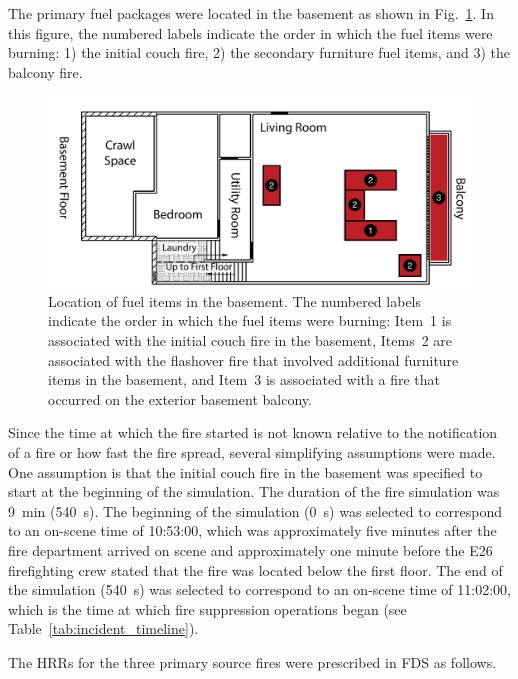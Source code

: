 \documentclass[12pt,oneside]{book}
\begin{document}
The primary fuel packages were located in the basement as shown in Fig.~\ref{fig:fuel_placement}. In this figure, the numbered labels indicate the order in which the fuel items were burning: 1) the initial couch fire, 2) the secondary furniture fuel items, and 3) the balcony fire.

\begin{figure}[!ht]
\includegraphics[width=5.5in]{../Figures/Plan_Basement_Fuels}
\caption[Location of fuel items in the basement.]
{Location of fuel items in the basement. The numbered labels indicate the order in which the fuel items were burning: Item~1 is associated with the initial couch fire in the basement, Items~2 are associated with the flashover fire that involved additional furniture items in the basement, and Item~3 is associated with a fire that occurred on the exterior basement balcony.}
\label{fig:fuel_placement}
\end{figure}


\clearpage


Since the time at which the fire started is not known relative to the notification of a fire or how fast the fire spread, several simplifying assumptions were made. One assumption is that the initial couch fire in the basement was specified to start at the beginning of the simulation. The duration of the fire simulation was 9~min (540~s). The beginning of the simulation (0~s) was selected to correspond to an on-scene time of 10:53:00, which was approximately five minutes after the fire department arrived on scene and approximately one minute before the E26 firefighting crew stated that the fire was located below the first floor. The end of the simulation (540~s) was selected to correspond to an on-scene time of 11:02:00, which is the time at which fire suppression operations began (see Table~\ref{tab:incident_timeline}).

The HRRs for the three primary source fires were prescribed in FDS as follows.
\end{document}
